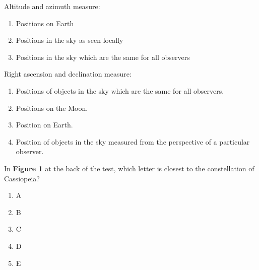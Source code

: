 \documentclass[11pt]{article}
\begin{document}
\begin{enumerate}
\begin{minipage}{\textwidth}
\begin{minipage}{\textwidth}
\end{minipage}
\end{minipage}
\vskip 0.20in

\begin{minipage}{\textwidth}
\begin{minipage}{\textwidth}
\item Altitude and azimuth measure:
\begin{enumerate} 
\setlength{\itemsep}{1pt} 
\setlength{\parskip}{0pt} 
\setlength{\parsep}{0pt}
\setlength{\multicolsep}{1pt} 
\item Positions on Earth
\item Positions in the sky as seen locally
\item Positions in the sky which are the same for all observers
\end{enumerate} 
\end{minipage}
\end{minipage}
\vskip 0.20in

\begin{minipage}{\textwidth}
\begin{minipage}{\textwidth}
\item Right ascension and declination measure:
\begin{enumerate} 
\setlength{\itemsep}{1pt} 
\setlength{\parskip}{0pt} 
\setlength{\parsep}{0pt}
\setlength{\multicolsep}{1pt} 
\item Positions of objects in the sky which are the same for all observers.
\item Positions on the Moon.
\item Position on Earth.
\item Position of objects in the sky measured from the perspective of a particular observer.
\end{enumerate} 
\end{minipage}
\end{minipage}
\vskip 0.20in

\begin{minipage}{\textwidth}
\begin{minipage}{\textwidth}
\item In {\bf Figure 1} at the back of the test, which letter is closest to the constellation of  Cassiopeia?
\begin{multicols}{3}
\begin{enumerate} 
\setlength{\itemsep}{1pt} 
\setlength{\parskip}{0pt} 
\setlength{\parsep}{0pt}
\setlength{\multicolsep}{1pt} 
\item A
\item B
\item C
\item D
\item E
\end{enumerate} 
\vfill 
\end{multicols}


\end{minipage}
\end{minipage}
\end{enumerate}
\end{document}
